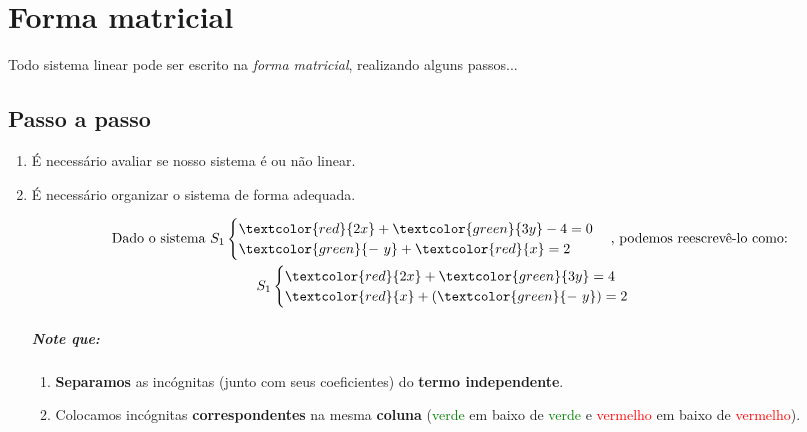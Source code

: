 \chapter{Forma matricial}

Todo sistema linear pode ser escrito na \textit{forma matricial}, realizando alguns passos...

\section{Passo a passo}

\begin{enumerate}
    \item É necessário avaliar se nosso sistema é ou não linear.
    
    \item É necessário organizar o sistema de forma adequada.
    
    \Example
    
    \begin{gather*}
        \text{Dado o sistema }S_1\begin{cases}
        \textcolor{red}{2x}+\textcolor{green}{3y}-4=0\\
        \textcolor{green}{-~y}+\textcolor{red}{x}=2
        \end{cases} \text{, podemos reescrevê-lo como:}\\
        S_1\begin{cases}
        \textcolor{red}{2x}+\textcolor{green}{3y}=4\\
        \textcolor{red}{x}+(\textcolor{green}{-~y})=2
        \end{cases}
    \end{gather*}
    
    \paragraph{Note que:}
    
    \begin{enumerate}
        \item \textbf{Separamos} as incógnitas (junto com seus coeficientes) do \textbf{termo independente}.
        \item Colocamos incógnitas \textbf{correspondentes} na mesma \textbf{coluna} (\textcolor{green}{verde} em baixo de \textcolor{green}{verde} e \textcolor{red}{vermelho} em baixo de \textcolor{red}{vermelho}).
    \end{enumerate}
    

\end{enumerate}
